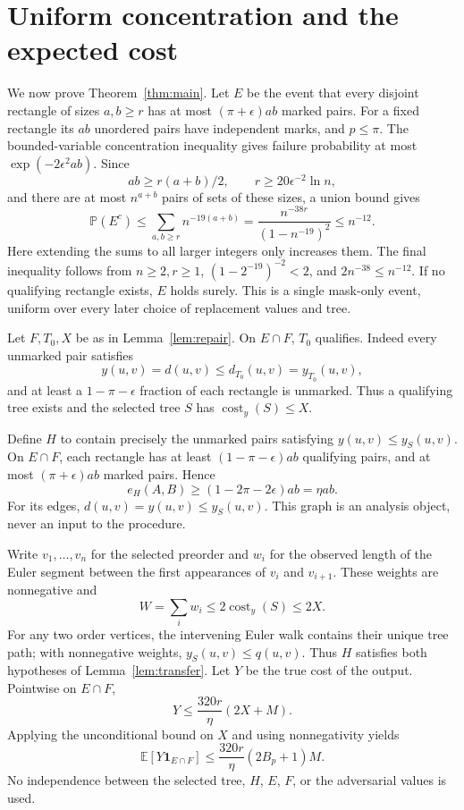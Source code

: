 \documentclass[acmlarge,screen,nonacm,11pt]{acmart}
\newcommand{\cost}{\operatorname{cost}}
\newcommand{\E}{\mathbb{E}}
\newcommand{\Prb}{\mathbb{P}}
\newcommand{\ind}{\mathbf{1}}
\begin{document}
\section{Uniform concentration and the expected cost}\label{sec:expectation}
We now prove Theorem~\ref{thm:main}. Let $E$ be the event that every disjoint rectangle of sizes $a,b\geq r$ has at most $(\pi+\epsilon)ab$ marked pairs. For a fixed rectangle its $ab$ unordered pairs have independent marks, and $p\leq\pi$. The bounded-variable concentration inequality gives failure probability at most $\exp(-2\epsilon^2ab)$. Since
\[
 ab\geq r(a+b)/2,\qquad r\geq20\epsilon^{-2}\ln n,
\]
and there are at most $n^{a+b}$ pairs of sets of these sizes, a union bound gives
\begin{equation}\label{eq:uniform}
 \Prb(E^c)\leq\sum_{a,b\geq r}n^{-19(a+b)}
 =\frac{n^{-38r}}{(1-n^{-19})^2}\leq n^{-12}.
\end{equation}
Here extending the sums to all larger integers only increases them. The final inequality follows from $n\geq2,r\geq1$, $(1-2^{-19})^{-2}<2$, and $2n^{-38}\leq n^{-12}$. If no qualifying rectangle exists, $E$ holds surely. This is a single mask-only event, uniform over every later choice of replacement values and tree.

Let $F,T_0,X$ be as in Lemma~\ref{lem:repair}. On $E\cap F$, $T_0$ qualifies. Indeed every unmarked pair satisfies
\[
 y(u,v)=d(u,v)\leq d_{T_0}(u,v)=y_{T_0}(u,v),
\]
and at least a $1-\pi-\epsilon$ fraction of each rectangle is unmarked. Thus a qualifying tree exists and the selected tree $S$ has $\cost_y(S)\leq X$.

Define $H$ to contain precisely the unmarked pairs satisfying $y(u,v)\leq y_S(u,v)$. On $E\cap F$, each rectangle has at least $(1-\pi-\epsilon)ab$ qualifying pairs, and at most $(\pi+\epsilon)ab$ marked pairs. Hence
\[
 e_H(A,B)\geq(1-2\pi-2\epsilon)ab=\eta ab.
\]
For its edges, $d(u,v)=y(u,v)\leq y_S(u,v)$. This graph is an analysis object, never an input to the procedure.

Write $v_1,\ldots,v_n$ for the selected preorder and $w_i$ for the observed length of the Euler segment between the first appearances of $v_i$ and $v_{i+1}$. These weights are nonnegative and
\[
 W=\sum_iw_i\leq2\cost_y(S)\leq2X.
\]
For any two order vertices, the intervening Euler walk contains their unique tree path; with nonnegative weights, $y_S(u,v)\leq q(u,v)$. Thus $H$ satisfies both hypotheses of Lemma~\ref{lem:transfer}. Let $Y$ be the true cost of the output. Pointwise on $E\cap F$,
\[
 Y\leq\frac{320r}{\eta}(2X+M).
\]
Applying the unconditional bound on $X$ and using nonnegativity yields
\begin{equation}\label{eq:good}
 \E[Y\ind_{E\cap F}]\leq\frac{320r}{\eta}(2B_p+1)M.
\end{equation}
No independence between the selected tree, $H$, $E$, $F$, or the adversarial values is used.
\end{document}

